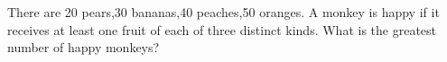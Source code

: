 There are 20 pears,30 bananas,40 peaches,50 oranges. A monkey is happy if it receives at least one fruit of each of three distinct kinds. What is the greatest number of happy monkeys?
